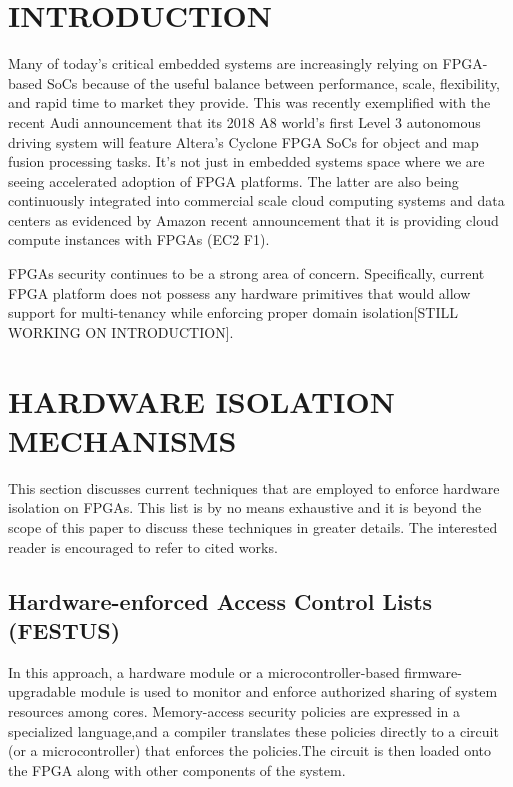\documentclass[sigconf]{acmart}
\theoremstyle{plain}
\theoremstyle{remark}
\begin{document}
\maketitle


\section{INTRODUCTION}\label{sec:intro}
Many of today's critical embedded systems are increasingly relying on FPGA-based SoCs because of the useful balance between performance, scale, flexibility, and rapid
time to market they provide. This was recently exemplified with the recent Audi announcement that its 2018 A8 world's first Level 3 autonomous driving system will
feature Altera's Cyclone FPGA SoCs for object and map fusion processing tasks. It's not just in embedded systems space where we are seeing accelerated adoption of FPGA platforms. The latter are also being continuously integrated into commercial scale cloud computing systems and data centers as evidenced by Amazon recent announcement that it is providing cloud compute instances with FPGAs (EC2 F1).

FPGAs security continues to be a strong area of concern. Specifically, current FPGA platform does not possess any hardware primitives that would allow support for multi-tenancy while enforcing proper domain isolation[STILL WORKING ON INTRODUCTION]. 

\section{HARDWARE ISOLATION MECHANISMS} \label{sec:problem_definition}

This section discusses current techniques that are employed to enforce hardware isolation on FPGAs. This list is by no means exhaustive and it is beyond the scope of this paper to discuss these techniques in greater details. The interested reader is encouraged to refer to cited works.  


\subsection{Hardware-enforced Access Control Lists (FESTUS)}

In this approach, a hardware module or a microcontroller-based firmware-upgradable module is used to monitor and enforce authorized sharing of system
resources among cores. Memory-access security policies are expressed in a specialized language,and a compiler translates these policies directly to a circuit (or a microcontroller) that enforces the policies.The circuit is then loaded onto the FPGA along with other components of the system.
\end{document}
